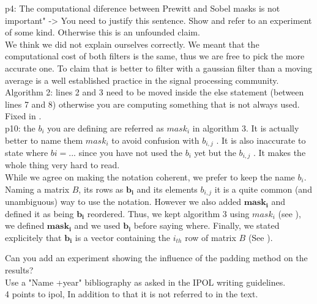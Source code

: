 \documentclass[a4paper,10pt]{report}
\begin{document}
\que p4: The computational diference between Prewitt and Sobel masks is not important" -> You need to justify this sentence. Show and refer to an experiment of some kind. Otherwise this is an unfounded claim. \\

\ans We think we did not explain ourselves correctly. We meant that the computational cost of both filters is the same, thus we are free to pick the more accurate one. To claim that is better to filter with a gaussian filter than a moving average is a well established practice in the signal processing community.\\

\que Algorithm 2: lines 2 and 3 need to be moved inside the else statement (between lines 7 and 8) otherwise you are computing something that is not always used.\\

\ans Fixed  in .\\

\que p10: the $b_i$ you are defining are referred as $mask_i$ in algorithm 3. It is actually better to name them
$mask_i$ to avoid confusion with $b_{i,j}$ . It is also inaccurate to state where $bi =...$ since you have not
used the $b_i$ yet but the $b_{i,j}$ . It makes the whole thing very hard to read.\\

\ans While we agree on making the notation coherent, we prefer to keep the name $b_i$. Naming a matrix $B$, its rows as $\mathbf{b_i}$ and its elements $b_{i,j}$ it is a quite common (and unambiguous) way to use the notation. However we also added $\mathbf{mask_i}$ and defined it as being $\mathbf{b_i}$ reordered. Thus, we kept algorithm 3 using $mask_i$ (see ), we defined $\mathbf{mask_i}$ and we used $\mathbf{b_i}$ before saying where. Finally, we stated explicitely that $\mathbf{b_i}$ is a vector containing the $i_{th} $ row of matrix $B$ (See ).

\que Can you add an experiment showing the influence of the padding method on the results?\\

\que Use a "Name +year" bibliography as asked in the IPOL writing guidelines.\\
4 points to ipol, In addition to that it is not referred to in the text.\\
\end{document}

